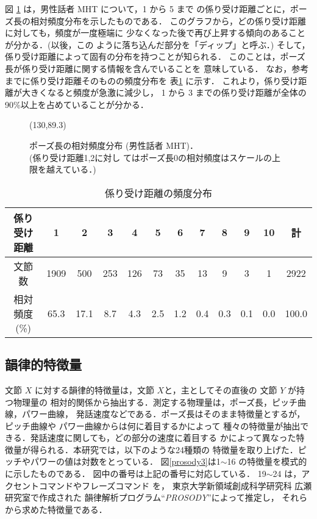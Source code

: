 図 \ref{pau1} は，男性話者 MHT について，1 から 5 まで
の係り受け距離ごとに，ポーズ長の相対頻度分布を示したものである．
このグラフから，どの係り受け距離に対しても，頻度が一度極端に
少なくなった後で再び上昇する傾向のあることが分かる．(以後，この
ように落ち込んだ部分を「ディップ」と呼ぶ．)
そして，係り受け距離によって固有の分布を持つことが知られる．
このことは，ポーズ長が係り受け距離に関する情報を含んでいることを
意味している．
なお，参考までに係り受け距離そのものの頻度分布を
表\ref{kakarifreq} に示す． 
これより，係り受け距離が大きくなると頻度が急激に減少し，
1 から 3 までの係り受け距離が全体の
 90\%以上を占めていることが分かる．
\begin{figure}
\begin{center}
\atari(130,89.3)
\caption{ポーズ長の相対頻度分布 (男性話者 MHT)．\\(係り受け距離1,2に対し
てはポーズ長0の相対頻度はスケールの上限を越えている．)}
\label{pau1}
\end{center}
\end{figure}

\small
\begin{table}
\caption{係り受け距離の頻度分布}
\label{kakarifreq}
\begin{center}
\begin{tabular}{|c||c|c|c|c|c|c|c|c|c|c||c|}
\hline
係り受け距離&1   &   2&  3&  4& 5& 6& 7&8&9&10&計\\\hline
文節数&1909&500 &253&126& 73& 35& 13&  9&  3&1&2922  \\
相対頻度(\%)&65.3&17.1&8.7&4.3&2.5&1.2&0.4&0.3&0.1&0.0&100.0\\
\hline
\end{tabular}
\end{center}
\end{table}
\normalsize

\subsection{韻律的特徴量}
文節 $X$ に対する韻律的特徴量は，文節 $X$と，主としてその直後の
文節 $Y$ が持つ物理量の
相対的関係から抽出する．測定する物理量は，ポーズ長，ピッチ曲線，パワー曲線，
発話速度などである．ポーズ長はそのまま特徴量とするが，ピッチ曲線や
パワー曲線からは何に着目するかによって
種々の特徴量が抽出できる．発話速度に関しても，どの部分の速度に着目する
かによって異なった特徴量が得られる．本研究では，以下のような24種類の
特徴量を取り上げた．ピッチやパワーの値は対数をとっている．
図\ref{prosody3}は1$\sim$16 の特徴量を模式的に示したものである．
図中の番号は上記の番号に対応している．
19$\sim$24 は，アクセントコマンドやフレーズコマンド
\cite{FUJ}を，
東京大学新領域創成科学研究科 広瀬研究室で作成された
韻律解析プログラム``{\it PROSODY}''\cite{MIN}によって推定し，
それらから求めた特徴量である．
\vspace{5mm}

